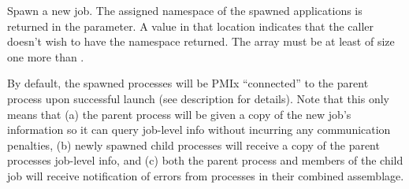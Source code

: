 
\optattrend

\descr

Spawn a new job.
The assigned namespace of the spawned applications is returned in the  parameter.
A  value in that location indicates that the caller doesn't wish to have the namespace returned.
The  array must be at least of size one more than .

By default, the spawned processes will be PMIx ``connected'' to the parent process upon successful launch (see  description for details).
Note that this only means that (a) the parent process will be given a copy of the new job's
information so it can query job-level info without incurring any communication penalties, (b) newly spawned child processes will receive a copy of the parent processes job-level info, and (c) both the parent process and members of the child job will receive notification of errors from processes in their combined assemblage.

